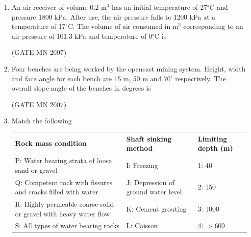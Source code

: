 \documentclass[journal]{IEEEtran}
\begin{document}
\begin{enumerate}
\item An air receiver of volume 0.2 m$^3$ has an initial temperature of 27$^\circ$C and pressure 1800 kPa. After use, the air pressure falls to 1200 kPa at a temperature of 17$^\circ$C. The volume of air consumed in m$^3$ corresponding to an air pressure of 101.3 kPa and temperature of 0$^\circ$C is  
\begin{enumerate}
\end{enumerate}

\hfill (GATE MN 2007)

\item Four benches are being worked by the opencast mining system. Height, width and face angle for each bench are 15 m, 50 m and 70$^\circ$ respectively. The overall slope angle of the benches in degrees is  
\begin{enumerate}
\end{enumerate}

\hfill (GATE MN 2007)

\item Match the following

\begin{tabular}{p{4.5cm} p{4.5cm} p{4cm}}
\textbf{Rock mass condition} & \textbf{Shaft sinking method} & \textbf{Limiting depth (m)} \\
P: Water bearing strata of loose sand or gravel & I: Freezing & 1: 40 \\
Q: Competent rock with fissures and cracks filled with water & J: Depression of ground water level & 2: 150 \\
R: Highly permeable coarse solid or gravel with heavy water flow & K: Cement grouting & 3: 1000 \\
S: All types of water bearing rocks & L: Caisson & 4: $>$600 \\
\end{tabular}


\end{enumerate}
\end{document}
